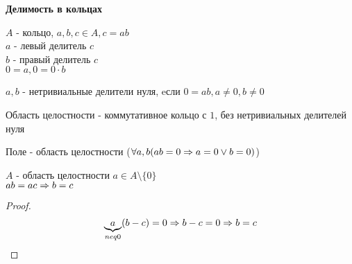 \textbf{Делимость в кольцах}

$A$ - кольцо, $a, b, c \in A, c = ab$\\
$a$ - левый делитель $c$\\
$b$ - правый делитель $c$\\
$ 0 = a, 0 = 0 \cdot b$ \\
    
\begin{Def}
	$a, b$ - нетривиальные делители нуля, eсли $0 = ab, a \neq 0, b \neq 0$\\
\end{Def}
	
\begin{Def}	
	Область целостности - коммутативное кольцо с $1$, без нетривиальных делителей нуля\\
\end{Def}

\begin{Rem}
	Поле - область целостности ($\forall a, b (ab = 0 \Rightarrow a = 0 \vee b = 0)$)\\
\end{Rem}
	
\begin{theorem}{}
	$A$ - область целостности $a \in A \setminus \lbrace 0 \rbrace$\\
	$ab = ac \Rightarrow b = c$
\end{theorem}
	
\begin{proof}
	$$ \underbrace{a}_{neq 0}(b - c) = 0 \Rightarrow b - c = 0 \Rightarrow b = c$$
\end{proof}	
